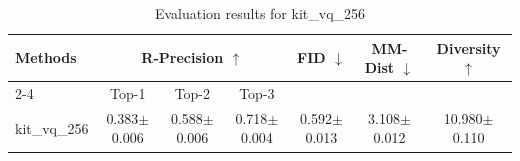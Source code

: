 \begin{table}[h]
\centering
\begin{tabular}{l ccc ccc}
\toprule
\multirow{2}{*}{\textbf{Methods}} & \multicolumn{3}{c}{\textbf{R-Precision $\uparrow$}} & \multirow{2}{*}{\textbf{FID $\downarrow$}} & \multirow{2}{*}{\textbf{MM-Dist $\downarrow$}} & \multirow{2}{*}{\textbf{Diversity $\uparrow$}} \\
\cmidrule(lr){2-4}
& Top-1 & Top-2 & Top-3 & & & \\
\midrule
kit_vq_256 & 0.383$\pm$0.006 & 0.588$\pm$0.006 & 0.718$\pm$0.004 & 0.592$\pm$0.013 & 3.108$\pm$0.012 & 10.980$\pm$0.110 \\
\bottomrule
\end{tabular}
\caption{Evaluation results for kit_vq_256}
\label{tab:results_kit_vq_256}
\end{table}
